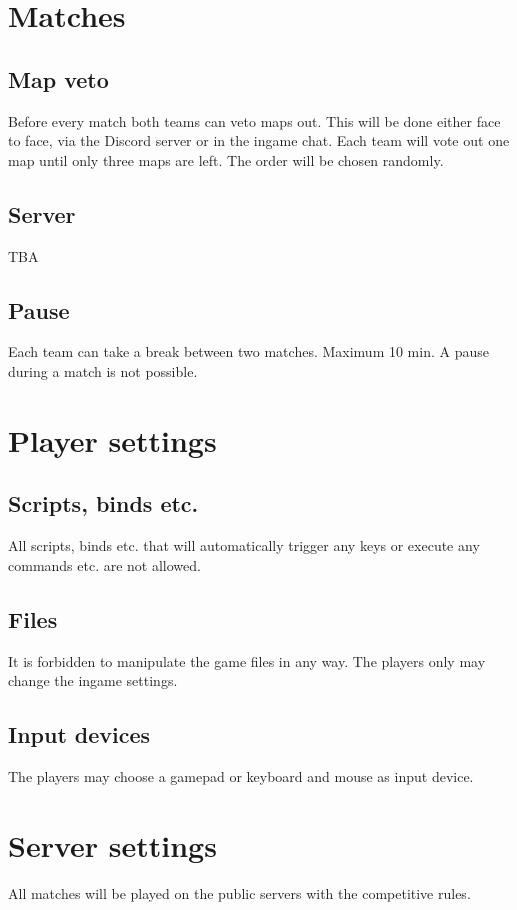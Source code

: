 \documentclass{article}
\begin{document}
\section{Matches}
\subsection{Map veto}
Before every match both teams can veto maps out. This will be done either face to face, via the
Discord server or in the ingame chat. Each team will vote out one map until only three maps are left.
The order will be chosen randomly.

\subsection{Server}
TBA

\subsection{Pause}
Each team can take a break between two matches. Maximum 10 min. A pause during a match is not
possible.

\section{Player settings}
\subsection{Scripts, binds etc.}
All scripts, binds etc. that will automatically trigger any keys or execute any commands etc. are not
allowed.

\subsection{Files}
It is forbidden to manipulate the game files in any way. The players only may change the ingame
settings.
\subsection{Input devices}
The players may choose a gamepad or keyboard and mouse as input device.
\section{Server settings}
All matches will be played on the public servers with the competitive rules.
\end{document}
